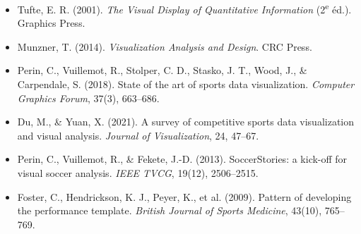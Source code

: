 \documentclass[11pt,a4paper]{article}
\begin{document}
\begin{itemize}[leftmargin=*]
    \item Tufte, E. R. (2001). \textit{The Visual Display of Quantitative Information} (2\textsuperscript{e} éd.). Graphics Press.
    \item Munzner, T. (2014). \textit{Visualization Analysis and Design}. CRC Press.
    \item Perin, C., Vuillemot, R., Stolper, C. D., Stasko, J. T., Wood, J., \& Carpendale, S. (2018). State of the art of sports data visualization. \textit{Computer Graphics Forum}, 37(3), 663--686.
    \item Du, M., \& Yuan, X. (2021). A survey of competitive sports data visualization and visual analysis. \textit{Journal of Visualization}, 24, 47--67.
    \item Perin, C., Vuillemot, R., \& Fekete, J.-D. (2013). SoccerStories: a kick-off for visual soccer analysis. \textit{IEEE TVCG}, 19(12), 2506--2515.
    \item Foster, C., Hendrickson, K. J., Peyer, K., et al. (2009). Pattern of developing the performance template. \textit{British Journal of Sports Medicine}, 43(10), 765--769.
\end{itemize}
\end{document}
